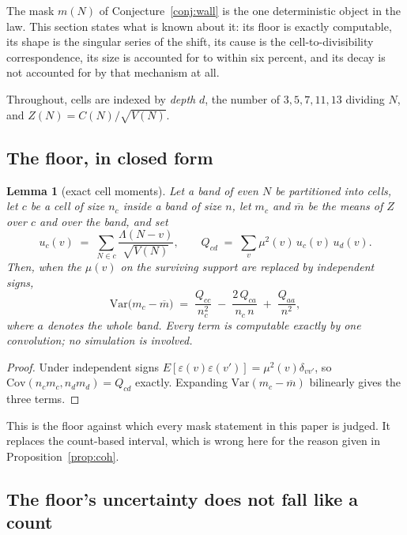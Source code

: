 \documentclass[11pt,a4paper]{article}
\theoremstyle{plain}
\newtheorem{lemma}[theorem]{Lemma}
\theoremstyle{definition}
\begin{document}
The mask $m(N)$ of Conjecture~\ref{conj:wall} is the one deterministic
object in the law. This section states what is known about it: its
floor is exactly computable, its shape is the singular series of the
shift, its cause is the cell-to-divisibility correspondence, its size
is accounted for to within six percent, and its decay is not accounted
for by that mechanism at all.

Throughout, cells are indexed by \emph{depth} $d$, the number of
$3,5,7,11,13$ dividing $N$, and $Z(N)=C(N)/\sqrt{V(N)}$.

\subsection{The floor, in closed form}

\begin{lemma}[exact cell moments]\label{lem:cellmom}
Let a band of even $N$ be partitioned into cells, let $c$ be a cell of
size $n_c$ inside a band of size $n$, let $m_c$ and $\overline m$ be
the means of $Z$ over $c$ and over the band, and set
\[
  u_c(v) \;=\; \sum_{N\in c}\frac{\Lambda(N-v)}{\sqrt{V(N)}},
  \qquad
  Q_{cd} \;=\; \sum_v \mu^2(v)\,u_c(v)\,u_d(v).
\]
Then, when the $\mu(v)$ on the surviving support are replaced by
independent signs,
\[
  \mathrm{Var}\bigl(m_c-\overline m\bigr)
  \;=\; \frac{Q_{cc}}{n_c^{2}}
  \;-\; \frac{2\,Q_{ca}}{n_c\,n}
  \;+\; \frac{Q_{aa}}{n^{2}},
\]
where $a$ denotes the whole band. Every term is computable exactly by
one convolution; no simulation is involved.
\end{lemma}

\begin{proof}
Under independent signs $E[\varepsilon(v)\varepsilon(v')]
=\mu^2(v)\delta_{vv'}$, so
$\mathrm{Cov}(n_c m_c, n_d m_d) = Q_{cd}$ exactly. Expanding
$\mathrm{Var}(m_c-\overline m)$ bilinearly gives the three terms.
\end{proof}

This is the floor against which every mask statement in this paper is
judged. It replaces the count-based interval, which is wrong here for
the reason given in Proposition~\ref{prop:coh}.

\subsection{The floor's uncertainty does not fall like a count}
\end{document}
